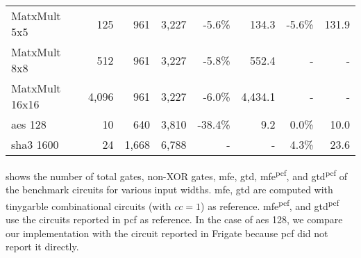 \begin{table}
{\begin{tabular}{l||rrr||rr||rr}
MatxMult 5x5              & 125                   & 961                         & 3,227                            & -5.6\%                                   & 134.3                                    & -5.6\%                                        & 131.9                                         \\
MatxMult 8x8              & 512                   & 961                         & 3,227                            & -5.8\%                                   & 552.4                                    & -                                             & -                                             \\
MatxMult 16x16            & 4,096                 & 961                         & 3,227                            & -6.0\%                                   & 4,434.1                                  & -                                             & -                                             \\ \hline
\acrshort{aes} 128                   & 10                    & 640                         & 3,810                            & -38.4\%                                    & 9.2                                     & 0.0\%                                         & 10.0                                          \\ \hline
\acrshort{sha}3 1600                 & 24                    & 1,668                       & 6,788                            & -                                        & -                                        & 4.3\%                                         & 23.6
\end{tabular}
}
\end{table}

 shows the number of total gates, non-XOR gates, \acrshort{mfe}, \acrshort{gtd}, \acrshort{mfe}\textsuperscript{\gls{pcf}}, and \acrshort{gtd}\textsuperscript{\gls{pcf}} of the benchmark circuits for various input widths.
\acrshort{mfe}, \acrshort{gtd} are computed with \gls{tinygarble} combinational circuits (with $cc=1$) as reference.
\acrshort{mfe}\textsuperscript{\gls{pcf}}, and \acrshort{gtd}\textsuperscript{\gls{pcf}} use the circuits reported in \gls{pcf} as reference.
In the case of \acrshort{aes} 128, we compare our implementation with the circuit reported in Frigate \cite{mood2016frigate} because \gls{pcf} did not report it directly.

